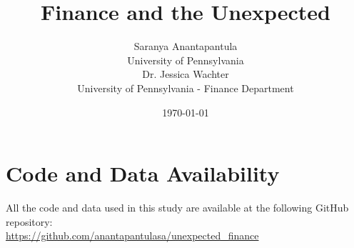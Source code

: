 \documentclass[12pt,a4paper]{article}
\title{\Large \textbf{Finance and the Unexpected}}
\author{
Saranya Anantapantula\\
\small University of Pennsylvania\\
Dr. Jessica Wachter\\
\small University of Pennsylvania - Finance Department
}
\date{\today}
\begin{document}
\maketitle












\appendix
\section{Code and Data Availability} \label{appendix:code}

All the code and data used in this study are available at the following GitHub repository: \\
\url{https://github.com/anantapantulasa/unexpected_finance}



\end{document}
